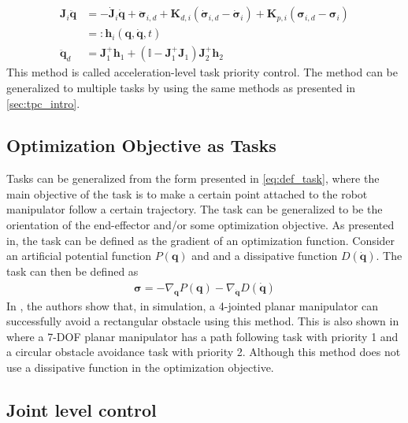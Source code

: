 \begin{subequations}
\begin{align}
    \bm{J}_i\ddot{\bm{q}} &= -\dot{\bm{J}}_i\dot{\bm{q}} + \ddot{\bm{\sigma}}_{i,d} 
    + \bm{K}_{d,i}\left(\dot{\bm{\sigma}}_{i,d} - \dot{\bm{\sigma}}_i\right)
    + \bm{K}_{p,i}\left(\bm{\sigma}_{i,d} - \bm{\sigma}_i\right) \\
    &=: \bm{h}_i(\bm{q}, \dot{\bm{q}}, t) \\
    \ddot{\bm{q}}_d &= \bm{J}_1^{+} \bm{h}_1 + \left(\mathbb{I} - \bm{J}_1^+\bm{J}_1\right) \bm{J}_2^{+} \bm{h}_2
\end{align}
\end{subequations}
This method is called acceleration-level task priority control. The method can
be generalized to multiple tasks by using the same methods as presented in \autoref{sec:tpc_intro}.

\subsection{Optimization Objective as Tasks}

Tasks can be generalized from the form presented in \autoref{eq:def_task}, where
the main objective of the task is to make a certain point attached to the robot
manipulator follow a certain trajectory. The task can be generalized to be the
orientation of the end-effector and/or some optimization objective. As presented
in\cite{nakamura1987}, the task can be defined as the gradient of an optimization
function. Consider an artificial potential function $P(\bm{q})$ and and a dissipative function
$D(\dot{\bm{q}})$. The task can then be defined as
\begin{align}
    \bm{\sigma} = -\nabla_{\bm{q}} P(\bm{q}) - \nabla_{\dot{\bm{q}}}D(\dot{\bm{q}})
\end{align}
In \cite{nakamura1987}, the authors show that, in simulation, a 4-jointed planar
manipulator can successfully avoid a rectangular obstacle using this method. This is
also shown in \cite{siciliano1991} where a 7-DOF planar manipulator has a path
following task with priority 1 and a circular obstacle avoidance task with priority 2.
Although this method does not use a dissipative function in the optimization objective.

\subsection{Joint level control}

